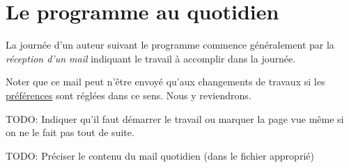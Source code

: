 % 
% 
% 
% 
% 
% 
% 
% 

\chapter{Le programme au quotidien}\hypertarget{programme-quotidien}{}\label{programme-quotidien}

La journée d'un auteur suivant le programme \unan{} commence généralement par la \emph{réception d'un mail} indiquant le travail à accomplir dans  la journée.

Noter que ce mail peut n'être envoyé qu'aux changements de travaux si les \hyperlink{preferences-auteur}{préférences} sont réglées dans ce sens. Nous y reviendrons.

TODO: Indiquer qu'il faut démarrer le travail ou marquer la page vue même si on ne le fait pas tout de suite.

TODO: Préciser le contenu du mail quotidien (dans le fichier approprié)

